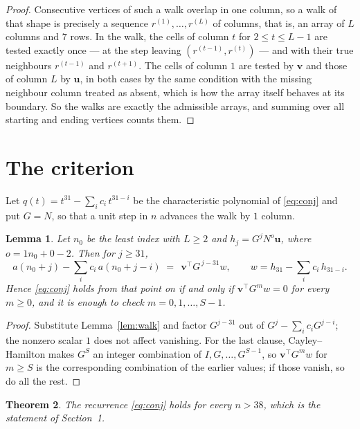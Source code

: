 \documentclass[11pt,a4paper]{article}
\theoremstyle{plain}
\newtheorem{theorem}{Theorem}
\newtheorem{lemma}[theorem]{Lemma}
\theoremstyle{definition}
\begin{document}
\begin{proof}
Consecutive vertices of such a walk overlap in one column, so a walk of that shape is
precisely a sequence $r^{(1)},\dots,r^{(L)}$ of columns, that is, an array of $L$ columns
and $7$ rows. In the walk, the cells of column $t$ for $2\le t\le L-1$ are tested
exactly once --- at the step leaving $(r^{(t-1)},r^{(t)})$ --- and with their true
neighbours $r^{(t-1)}$ and $r^{(t+1)}$. The cells of column $1$ are tested by
$\mathbf{v}$ and those of column $L$ by $\mathbf{u}$, in both cases by the same condition
with the missing neighbour column treated as absent, which is how the array itself behaves at
its boundary. So the walks are exactly the admissible arrays, and summing over all starting
and ending vertices counts them.
\end{proof}

\section{The criterion}

Let $q(t)=t^{31}-\sum_i c_i\,t^{31-i}$ be the characteristic polynomial of
\eqref{eq:conj} and put $G=N$, so that a unit step in $n$ advances the walk by
$1$ column.

\begin{lemma}\label{lem:crit}
Let $n_0$ be the least index with $L\ge2$ and $h_j=G^{j}N^{o}\mathbf{u}$, where
$o=1n_0+0-2$. Then for $j\ge31$,
\[
a(n_0+j)-\sum_i c_i\,a(n_0+j-i)\;=\;\,\mathbf{v}^{\!\top}G^{\,j-31}w,
\qquad w=h_{31}-\sum_i c_i\,h_{31-i} .
\]
Hence \eqref{eq:conj} holds from that point on if and only if
$\mathbf{v}^{\!\top}G^{m}w=0$ for every $m\ge0$, and it is enough to check
$m=0,1,\dots,S-1$.
\end{lemma}

\begin{proof}
Substitute Lemma~\ref{lem:walk} and factor $G^{j-31}$ out of
$G^{j}-\sum_ic_iG^{j-i}$; the nonzero scalar $1$ does not affect
vanishing. For the last clause, Cayley--Hamilton makes $G^{S}$ an integer combination of
$I,G,\dots,G^{S-1}$, so $\mathbf{v}^{\!\top}G^{m}w$ for $m\ge S$ is the corresponding
combination of the earlier values; if those vanish, so do all the rest.
\end{proof}

\begin{theorem}
The recurrence \eqref{eq:conj} holds for every $n>38$, which is the statement of
Section~1.
\end{theorem}
\end{document}
